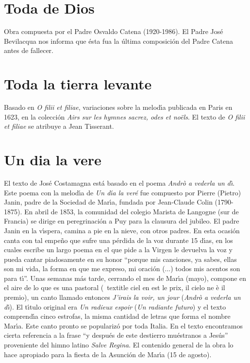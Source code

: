 \documentclass[landscape,12pt]{report}
\begin{document}
\section*{\small Toda de Dios} \noindent\footnotesize Obra compuesta por el Padre Osvaldo Catena (1920-1986). El Padre Jos\'e Bevilacqua nos informa que \'esta fua la \'ultima composici\'on del Padre Catena antes de fallecer.
\section*{\small Toda la tierra levante} \noindent\footnotesize Basado en \textit{O filii et filiae}, variaciones sobre la melod\'\i a publicada en Paris en 1623, en la colecci\'on \textit{Airs sur les hymnes sacrez, odes et 	no\"els}. El texto de \textit{O filii et filiae} se atribuye a Jean Tisserant. 
\section*{\small Un dia la vere} \noindent\footnotesize El texto de Jos\'e Costamagna est\'a basado en el poema \textit{Andr\`o a vederla un d\`\i}. Este poema con la melod\'\i a de \textit{Un d\'\i a la ver\'e} fue compuesto por Pierre (Pietro) Janin, padre de la Sociedad de Mar\'\i a, fundada por Jean-Claude Colin (1790-1875). En abril de 1853, la comunidad del colegio Marista de Langogne (sur de Francia) se dirige en peregrinaci\'on a Puy para la clausura del jubileo. El padre Janin en la v\'\i spera, camina a pie en la nieve, con otros padres. En esta ocasi\'on canta con tal empe\~no que sufre una p\'erdida de la voz durante 15 d\'\i as, en los cuales escribe un largo poema en el que pide a la Virgen le devuelva la voz  y pueda cantar piadosamente en su honor ``porque mis canciones, ya sabes, ellas son mi vida, la forma en que me expreso, mi oraci\'on (...) todos mis acentos son para t\'\i''. Unas semanas m\'as tarde, cerrando el mes de Mar\'\i a (mayo), compone en el aire de lo que es una pastoral (\
textit{le ciel en est le prix, il cielo ne \`e il premio}), un canto llamado entonces \textit{J'irais la voir, un jour} (\textit{Andr\`o a vederla un d\`\i}). El t\'\i tulo original era \textit{Un radieux espoir} (\textit{Un radiante futuro}) y el texto comprend\'\i a cinco estrofas, la misma cantidad de letras que forma el nombre Mar\'\i a. Este canto pronto se populariz\'o por toda Italia. En el texto encontramos cierta referencia a la frase ``y despu\'es de este destierro mu\'estranos a Jes\'us'' proveniente del himno latino  \textit{Salve Regina}. El contenido general de la obra lo hace apropiado para la fiesta de la Asunci\'on de Mar\'\i a (15 de agosto).
\end{document}
